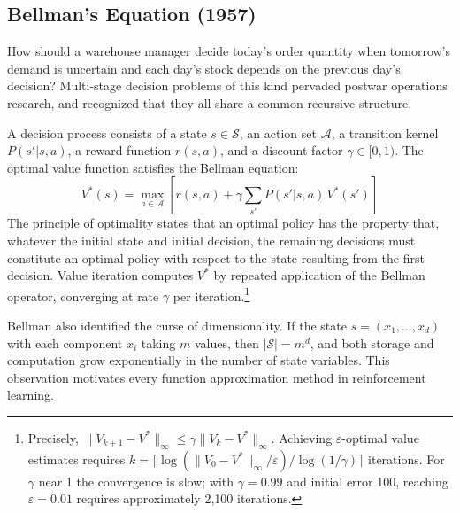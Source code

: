 \subsection{Bellman's Equation (1957)}

How should a warehouse manager decide today's order quantity when tomorrow's demand is uncertain and each day's stock depends on the previous day's decision? Multi-stage decision problems of this kind pervaded postwar operations research, and \citet{Bellman1957} recognized that they all share a common recursive structure.

A decision process consists of a state $s \in \mathcal{S}$, an action set $\mathcal{A}$, a transition kernel $P(s'|s,a)$, a reward function $r(s,a)$, and a discount factor $\gamma \in [0,1)$. The optimal value function satisfies the Bellman equation:
\begin{equation}
V^*(s) = \max_{a \in \mathcal{A}} \left[ r(s,a) + \gamma \sum_{s'} P(s'|s,a) \, V^*(s') \right]
\label{eq:bellman}
\end{equation}
The principle of optimality states that an optimal policy has the property that, whatever the initial state and initial decision, the remaining decisions must constitute an optimal policy with respect to the state resulting from the first decision. Value iteration computes $V^*$ by repeated application of the Bellman operator, converging at rate $\gamma$ per iteration.\footnote{Precisely, $\|V_{k+1} - V^*\|_\infty \leq \gamma \|V_k - V^*\|_\infty$. Achieving $\varepsilon$-optimal value estimates requires $k = \lceil \log(\|V_0 - V^*\|_\infty / \varepsilon) / \log(1/\gamma) \rceil$ iterations. For $\gamma$ near 1 the convergence is slow; with $\gamma = 0.99$ and initial error 100, reaching $\varepsilon = 0.01$ requires approximately 2{,}100 iterations.}

Bellman also identified the curse of dimensionality. If the state $s = (x_1, \ldots, x_d)$ with each component $x_i$ taking $m$ values, then $|\mathcal{S}| = m^d$, and both storage and computation grow exponentially in the number of state variables. This observation motivates every function approximation method in reinforcement learning.

